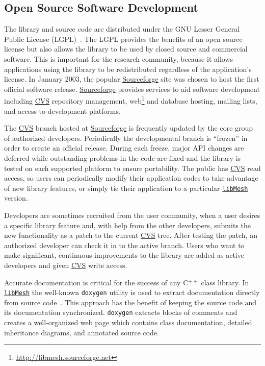 \documentclass[global,twocolumn,final]{svjour}
\newcommand{\libMesh}{\href{http://libmesh.sourceforge.net}{\texttt{lib\-Mesh}}}
\newcommand{\CVS}{\href{http://www.nongnu.org/cvs}{CVS}}
\newcommand{\Sourceforge}{\href{http://www.sourceforge.net}{Sourceforge}}
\newcommand{\cpp}{C{\tiny$^{++}$}}
\begin{document}
\subsection{Open Source Software Development}
The library and source code are distributed under the GNU Lesser
General Public License (LGPL)~\cite{gnu_lgpl}.  The LGPL provides the
benefits of an open source license but also allows the library to be
used by closed source and commercial software.  This is important for
the research community, because it allows applications using the
library to be redistributed regardless of the application's license.
In January 2003, the popular \Sourceforge{} site was chosen to host
the first official software release.  \Sourceforge{} provides
services to aid software development including \CVS{} repository
management, web\footnote{\url{http://libmesh.sourceforge.net}} and
database hosting, mailing lists, and access to development platforms.

The \CVS{} branch hosted at \Sourceforge{} is frequently updated by the core
group of authorized developers.  Periodically the developmental branch
is ``frozen'' in order to create an official release.  During each
freeze, major API changes are deferred while outstanding problems in
the code are fixed and the library is tested on each supported
platform to ensure portability.
The public has \CVS{} read access, so users can periodically modify
their application codes to take advantage of new library features, or
simply tie their application to a particular \libMesh{} version.

Developers are sometimes recruited from the user community,
when a user desires a specific library feature and,
with help from the other developers, submits the new functionality
as a patch to the current \CVS{} tree.  After testing the patch, an
authorized developer can check it in to the active branch.
Users who want to make significant, continuous
improvements to the library are added as active
developers and given \CVS{} write access.

Accurate documentation is critical for the success of any \cpp{} class
library.  In \libMesh{} the well-known \texttt{doxygen} utility is
used to extract documentation directly from source
code~\cite{using_doxygen}.  This approach has the benefit of keeping
the source code and its documentation synchronized.  \texttt{doxygen} extracts
blocks of comments and creates a well-organized web page which
contains class documentation, detailed inheritance diagrams, and
annotated source code.
\end{document}
